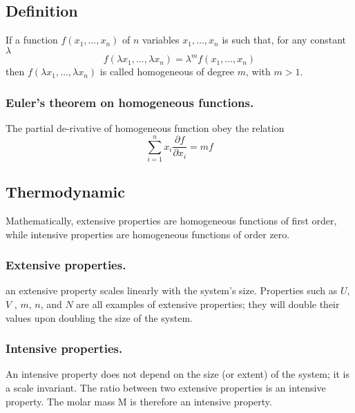 \documentclass[../../../Main.tex]{subfiles}
\begin{document}
\subsection*{Definition}
If a function $f(x_1,\dots, x_n)$ of $n$ variables $x_1,\dots, x_n$ is such that, for any constant $\lambda$
\begin{equation*}
    f(\lambda x_1,\dots,\lambda x_n )=\lambda^mf( x_1,\dots, x_n )
\end{equation*}
then $f(\lambda x_1,\dots,\lambda x_n )$ is called homogeneous of degree $m$, with $m>1$.

\subsubsection*{Euler’s theorem on homogeneous functions.} The partial de-rivative of homogeneous function obey the relation 
\begin{equation*}
    \sum_{i=1}^{n }x_i\frac{\partial f}{\partial x_i}=mf
\end{equation*} 

\subsection*{Thermodynamic}
Mathematically, extensive properties are homogeneous functions of first order, while intensive properties are homogeneous functions of order zero. 
\subsubsection*{Extensive properties.} an extensive property scales linearly with the system’s size. Properties such as $U$, $V$ , $m$, $n$, and $N$ are all examples of extensive properties; they will double their values upon doubling the size of the system. 

\subsubsection*{Intensive properties.} An intensive property does not depend on the size (or extent) of the system; it is a scale invariant. The ratio between two extensive properties is an intensive property. The molar mass M is therefore an intensive property.
\end{document}
